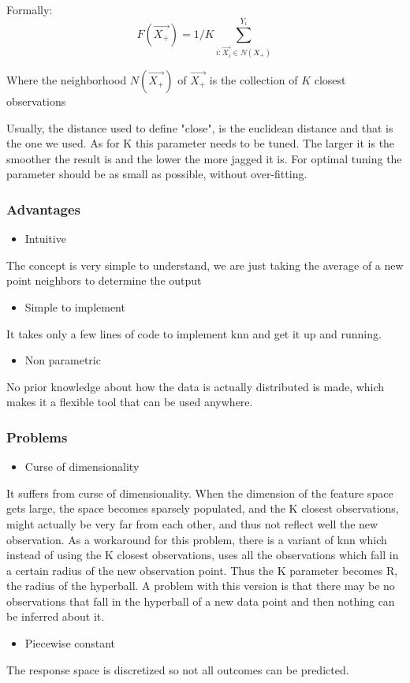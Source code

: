 Formally:
 $$
 F(\vec{X_+}) = 1/K \sum_{i:\vec{X_i} \in N(X_+)}^{Y_i}
 $$

Where the neighborhood $N(\vec{X_+})$ of $ \vec{X_+} $ is the collection of $K$ closest observations

Usually, the distance used to define "close", is the euclidean distance and that is the one we used. As for K this parameter needs to be tuned. The larger it is the smoother the result is and the lower the more jagged it is. For optimal tuning the parameter should be as small as possible, without over-fitting.
\subsubsection{Advantages}
\begin{itemize}
\item Intuitive
\end{itemize}
The concept is very simple to understand, we are just taking the average of a new point neighbors to determine the output
\begin{itemize}
\item Simple to implement
\end{itemize}
It takes only a few lines of code to implement \acrshort{knn} and get it up and running.
\begin{itemize}
\item Non parametric
\end{itemize}
No prior knowledge about how the data is actually distributed is made, which makes it a flexible tool that can be used anywhere.

\subsubsection{Problems}
\begin{itemize}
\item Curse of dimensionality 
\end{itemize}
It suffers from curse of dimensionality. When the dimension of the feature space gets large, the space becomes sparsely populated, and the K closest observations, might actually be very far from each other, and thus not reflect well the new observation.
As a workaround for this problem, there is a variant of \acrshort{knn} which instead of using the K closest observations, uses all the observations which fall in a certain radius of the new observation point. Thus the K parameter becomes R, the radius of the hyperball. A problem with this version is that there may be no observations that fall in the hyperball of a new data point and then nothing can be inferred about it.
\begin{itemize}
\item Piecewise constant
\end{itemize}
The response space is discretized so not all outcomes can be predicted.

